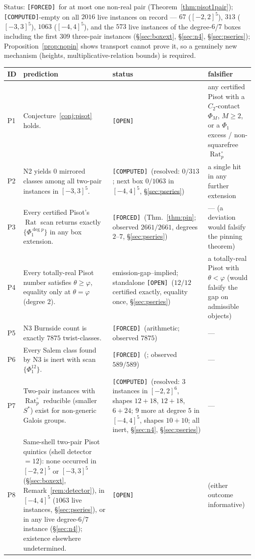 \documentclass[11pt]{article}
\newcommand{\F}{\textnormal{\texttt{[FORCED]}}}
\newcommand{\C}{\textnormal{\texttt{[COMPUTED]}}}
\newcommand{\Op}{\textnormal{\texttt{[OPEN]}}}
\newcommand{\Rat}{\operatorname{Rat}}
\theoremstyle{definition}
\begin{document}
Status: \F\ for at most one non-real pair (Theorem~\ref{thm:pisot1pair});
\C-empty on all $2016$ live instances on record --- $67$ ($[-2,2]^5$),
$313$ ($[-3,3]^5$), $1063$ ($[-4,4]^5$), and the $573$ live instances of
the degree-$6$/$7$ boxes including the first $309$ three-pair instances
(\S\ref{sec:boxext}, \S\ref{sec:n4}, \S\ref{sec:pseries});
Proposition~\ref{prop:nopin} shows transport cannot prove it, so a genuinely
new mechanism (heights, multiplicative-relation bounds) is required.

\begin{center}
\small
\begin{tabular}{p{0.6cm}p{8.2cm}p{2.4cm}p{3.6cm}}
\hline
ID & prediction & status & falsifier\\
\hline
P1 & Conjecture~\ref{conj:pisot} holds. & \Op & any certified Pisot with a
$C_2$-contact $\Phi_M$, $M\ge2$, or a $\Phi_1$ excess / non-squarefree
$\Rat_p^{\circ}$\\
P2 & N2 yields $0$ mirrored classes among all two-pair instances in
$[-3,3]^5$. & \C\ (resolved: $0/313$; next box $0/1063$ in $[-4,4]^5$,
\S\ref{sec:pseries}) & a single hit in any further extension\\
P3 & Every certified Pisot's $\Rat$ scan returns exactly $\{\Phi_1^{\deg p}\}$
in any box extension. & \F\ (Thm.~\ref{thm:pin}; observed $2661/2661$,
degrees $2$--$7$, \S\ref{sec:pseries}) & --- (a deviation would
falsify the pinning theorem)\\
P4 & Every totally-real Pisot number satisfies $\theta\ge\varphi$, equality
only at $\theta=\varphi$ (degree $2$). & emission-gap--implied; standalone
\Op\ ($12/12$ certified exactly, equality once, \S\ref{sec:pseries}) & a
totally-real Pisot with $\theta<\varphi$ (would falsify the gap on
admissible objects)\\
P5 & N3 Burnside count is exactly $7875$ twist-classes. & \F\ (arithmetic;
observed $7875$) & ---\\
P6 & Every Salem class found by N3 is inert with scan $\{\Phi_1^{12}\}$.
& \F\ (\cite[Cor.~7.14]{relcharge}; observed $589/589$) & ---\\
P7 & Two-pair instances with $\Rat_p^{\circ}$ reducible (smaller $S^{*}$)
exist for non-generic Galois groups. & \C\ (resolved: $3$ instances in
$[-2,2]^6$, shapes $12{+}18$, $12{+}18$, $6{+}24$; $9$ more at degree $5$
in $[-4,4]^5$, shapes $10{+}10$; all inert, \S\ref{sec:n4},
\S\ref{sec:pseries}) & ---\\
P8 & Same-shell two-pair Pisot quintics (shell detector $=12$): none occurred
in $[-2,2]^5$ or $[-3,3]^5$ (\S\ref{sec:boxext},
Remark~\ref{rem:detector}), in $[-4,4]^5$ ($1063$ live instances,
\S\ref{sec:pseries}), or in any live degree-$6$/$7$ instance
(\S\ref{sec:n4}); existence elsewhere undetermined.
& \Op & (either outcome informative)\\
\hline
\end{tabular}
\end{center}
\end{document}
